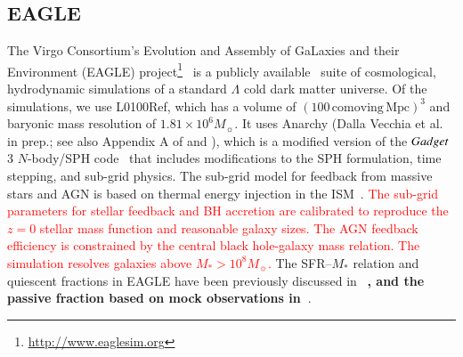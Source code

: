 \documentclass[tighten, preprint]{aastex62}
\begin{document}
\subsection{EAGLE}
The Virgo Consortium's Evolution and Assembly of GaLaxies and their 
Environment (EAGLE)
project\footnote{\url{http://www.eaglesim.org}}~\citep{schaye2015, crain2015} 
is a publicly available~\citep{mcalpine2016} suite 
of cosmological, hydrodynamic simulations of a standard 
$\Lambda$ cold dark matter universe. Of the simulations, we use 
L0100Ref, which has a volume of $(100\,\mathrm{comoving\,Mpc})^3$ and 
baryonic mass resolution of $1.81\times 10^6M_{\sun}$. 
It uses {\sc Anarchy} (Dalla Vecchia et al. in prep.; 
see also Appendix A of \citealt{schaye2015} and \citealt{schaller2015}), 
which is a modified version of the ${\sc Gadget}$ 3 $N$-body/SPH 
code~\citep{springel2005} 
that includes modifications to the SPH formulation, time stepping, and 
sub-grid physics. The sub-grid model for feedback from massive stars 
and AGN is based on thermal energy injection in the ISM~\citep{dallavecchia2012}.  
\textcolor{red}{The sub-grid parameters for stellar feedback and BH 
accretion are calibrated to reproduce the $z=0$ stellar mass function 
and reasonable galaxy sizes. The AGN feedback efficiency is 
constrained by the central black hole-galaxy mass relation. 
The simulation resolves galaxies above $M_* > 10^{8} M_\sun$.} %
The SFR--$M_*$ relation and quiescent fractions in EAGLE have been 
previously discussed in~\citet{furlong2015, trayford2015}
{\bf \color{red}, and the passive fraction based on mock observations in~\citet{trayford2017}}. 
\end{document}
